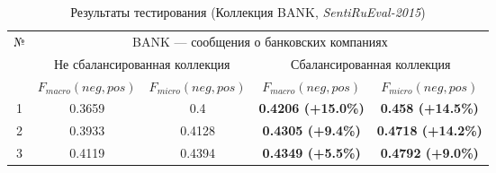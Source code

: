 \begin{table}[ht!]
\centering
\caption{Результаты тестирования (Коллекция BANK, {\it SentiRuEval-2015})}
\label{table:bankResult2015}
\begin{tabular}{|c|c|c|c|c|}
\hline
\multirow{3}{*}{№} & \multicolumn{4}{c|}{BANK --- сообщения о банковских компаниях}                                                               \\ \cline{2-5}
                   & \multicolumn{2}{c|}{Не сбалансированная коллекция} & \multicolumn{2}{c|}{Сбалансированная коллекция} \\ \cline{2-5}
                   & $F_{macro}(neg, pos)$    & $F_{micro}(neg, pos)$   & $F_{macro}(neg, pos)$  & $F_{micro}(neg, pos)$  \\ \hline
1                  & 0.3659                   & 0.4                     & {\bf 0.4206 (+15.0\%)}       & {\bf 0.458 (+14.5\%) }       \\ \hline
2                  & 0.3933                   & 0.4128                  & {\bf 0.4305 (+9.4\%) }       & {\bf 0.4718 (+14.2\%)}       \\ \hline
3                  & 0.4119                   & 0.4394                  & {\bf 0.4349 (+5.5\%) }       & {\bf 0.4792 (+9.0\%) }       \\ \hline
\end{tabular}
\end{table}
